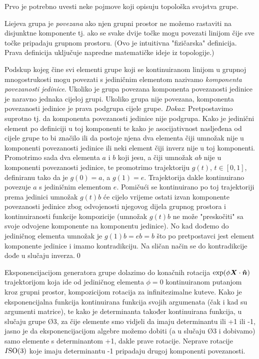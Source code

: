 Prvo je potrebno uvesti neke pojmove koji opisuju topološka
svojstva grupe.
\begin{definicija}[Povezanost]
Liejeva grupa je \emph{povezana} ako njen grupni prostor ne možemo
rastaviti na disjunktne komponente tj. ako se svake dvije točke 
mogu povezati linijom čije sve točke pripadaju grupnom prostoru.
(Ovo je intuitivna "fizičarska" definicija. Prava definicija uključuje napredne
matematičke ideje iz topologije.)
\label{def:povezanost}
\end{definicija}
Podskup kojeg čine svi elementi grupe koji se
kontinuiranom linijom u grupnoj mnogostrukosti mogu povezati s
jediničnim elementom nazivamo \emph{komponenta povezanosti jedinice}.
Ukoliko je grupa povezana komponenta povezanosti jedinice je naravno
jednaka cijeloj grupi. Ukoliko grupa nije povezana, komponenta povezanosti
jedinice je prava podgrupa cijele grupe. \emph{Dokaz}: Pretpostavimo
suprotno tj. da komponenta povezanosti jedinice nije podgrupa. Kako je
jedinični element po definiciji u toj komponenti te kako je asocijativnost
nasljeđena od cijele grupe to bi značilo ili da postoje njena dva elementa čiji
umnožak nije u komponenti povezanosti jedinice ili neki element čiji inverz nije u 
toj komponenti.
Promotrimo sada dva elementa $a$ i $b$ koji jesu, a čiji umnožak $ab$ nije u komponenti
povezanosti jedinice, te promotrimo trajektoriju $g(t)$, $t\in[0,1]$,
definiranu tako da je $g(0)=a$, a $g(1)=e$. Trajektorija dakle
kontinuirano povezuje $a$ s jediničnim elementom $e$.
Pomičući se kontinuirano po toj trajektoriji prema jedinici
umnožak $g(t)b$ će cijelo vrijeme ostati izvan komponente povezanosti jedinice
zbog odvojenosti njegovog dijela grupnog prostora i kontinuiranosti
funkcije kompozicije (umnožak $g(t)b$ ne može "preskočiti" sa svoje odvojene
komponente na komponentu jedinice). No kad dođemo do jediničnog elementa
umnožak je $g(1)b = eb = b$ što po pretpostavci jest element komponente jedinice
i imamo kontradikciju. Na sličan način se do kontradikcije dođe u slučaju inverza.\qed

Eksponencijacijom generatora grupe  dolazimo do konačnih rotacija
$\exp(\phi \vec{X}\cdot\unitn)$ trajektorijom koja ide od jediničnog
elementa $\phi=0$ kontinuiranom putanjom kroz grupni prostor, kompozicijom rotacija za
infinitezimalne kuteve. Kako je eksponencijalna funkcija kontinuirana
funkcija svojih argumenata (čak i kad su argumenti matrice), te kako
je determinanta također kontinuirana funkcija, u slučaju grupe \O{3},
za čije elemente smo vidjeli da imaju determinantu ili +1 ili -1,
jasno je da eksponencijacijom algebre možemo dobiti (a u slučaju \O{3}
i dobivamo) samo elemente s determinantom +1, dakle prave rotacije.
Neprave rotacije $I\mathrm{SO}(3)$ koje imaju determinantu -1
pripadaju drugoj komponenti povezanosti. \label{pag:povezanostO3}



